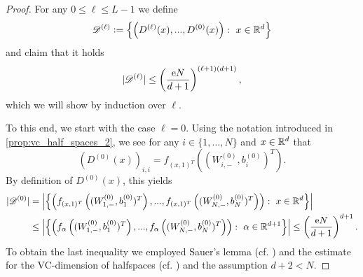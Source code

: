 \begin{proof}
For any $0\leq \ell \leq L-1$ we define
\begin{equation*}
\mathscr{D}^{(\ell)} \mathrel{\mathop:}= \left\{ \left(D^{(\ell)}(x), ..., D^{(0)}(x)\right): \ x \in \mathbb{R}^d\right\}
\end{equation*}
and claim that it holds
\begin{equation}\label{eq:ind_d}
\vert \mathscr{D}^{(\ell)} \vert \leq \left(\frac{\mathrm{e} N}{d+1}\right)^{(\ell + 1)(d+1)},
\end{equation}
which we will show by induction over $\ell$. 

To this end, we start with the case $\ell = 0$. Using the notation introduced in \cref{prop:vc_half_spaces_2}, we see for any $i \in \{1,...,N\}$ and $x \in \mathbb{R}^d$ that 
\begin{equation*}
\left(D^{(0)}(x)\right)_{i,i} = f_{(x,1)^T}\left((W^{(0)}_{i,-}, b^{(0)}_{i})^T\right).
\end{equation*}
By definition of $D^{(0)}(x)$, this yields
\begin{align*}
\vert\mathscr{D}^{(0)} \vert &= \left\vert \left\{ \left(f_{(x,1)^T}\left((W^{(0)}_{1,-}, b^{(0)}_{1})^T\right),..., f_{(x,1)^T}\left((W^{(0)}_{N,-}, b^{(0)}_{N})^T\right)\right): \ x \in \mathbb{R}^d\right\}\right\vert \\
&\leq \left\vert \left\{ \left(f_{\alpha}\left((W^{(0)}_{1,-}, b^{(0)}_{1})^T\right),..., f_{\alpha}\left((W^{(0)}_{N,-}, b^{(0)}_{N})^T\right)\right): \ \alpha \in \mathbb{R}^{d+1}\right\}\right\vert \leq \left(\frac{\mathrm{e} N}{d+1}\right)^{d+1}.
\end{align*}
To obtain the last inequality we employed Sauer's lemma (cf. \cite[Lemma 6.10]{shalev2014understanding}) and the estimate for the VC-dimension of halfspaces (cf. ) and the assumption $d+2 < N$.


\end{proof}
